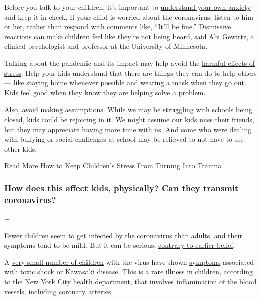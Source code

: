 Before you talk to your children, it's important to
\href{https://www.nytimes3xbfgragh.onion/2020/03/17/parenting/coronavirus-kids-talk.html}{understand
your own anxiety} and keep it in check. If your child is worried about
the coronavirus, listen to him or her, rather than respond with comments
like, ``It'll be fine.'' Dismissive reactions can make children feel
like they're not being heard, said Abi Gewirtz, a clinical psychologist
and professor at the University of Minnesota.

Talking about the pandemic and its impact may help avoid the
\href{https://www.nytimes3xbfgragh.onion/2020/05/20/us/coronavirus-young-people-emotional-toll.html}{harmful
effects of stress}. Help your kids understand that there are things they
can do to help others --- like staying home whenever possible and
wearing a mask when they go out. Kids feel good when they know they are
helping solve a problem.

Also, avoid making assumptions. While we may be struggling with schools
being closed, kids could be rejoicing in it. We might assume our kids
miss their friends, but they may appreciate having more time with us.
And some who were dealing with bullying or social challenges at school
may be relieved to not have to see other kids.

Read More
\href{https://www.nytimes3xbfgragh.onion/2020/05/07/well/family/coronavirus-children-stress-parents.html}{How
to Keep Children's Stress From Turning Into Trauma}

\hypertarget{how-does-this-affect-kids-physically-can-they-transmit-coronavirus}{%
\subsubsection{How does this affect kids, physically? Can they transmit
coronavirus?}\label{how-does-this-affect-kids-physically-can-they-transmit-coronavirus}}

+

Fewer children seem to get infected by the coronavirus than adults, and
their symptoms tend to be mild. But it can be serious,
\href{https://www.nytimes3xbfgragh.onion/2020/05/12/well/family/coronavirus-children-covid-19.html}{contrary
to earlier belief}.

A
\href{https://www.nytimes3xbfgragh.onion/2020/05/19/parenting/pmis-coronavirus-children.html}{very
small number of children} with the virus have shown
\href{https://www.nytimes3xbfgragh.onion/article/coronavirus-symptoms.html}{symptoms}
associated with toxic shock or
\href{https://www.nytimes3xbfgragh.onion/article/kawasaki-disease-coronavirus-children.html}{Kawasaki
disease}. This is a rare illness in children, according to the New York
City health department, that involves inflammation of the blood vessels,
including coronary arteries.

